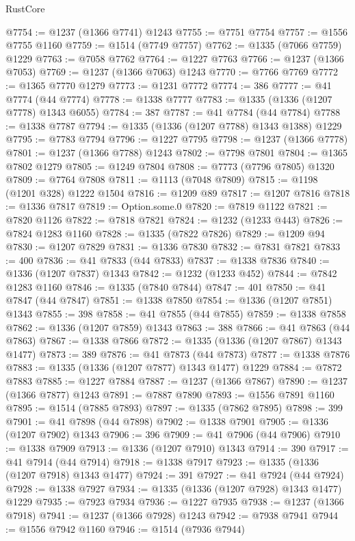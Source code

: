 \begin{lexlean}{RustCore}
\begin{coremodule}
@7754 := @1237 (@1366 @7741) @1243
@7755 := @7751 @7754
@7757 := @1556 @7755 @1160
@7759 := @1514 (@7749 @7757)
@7762 := @1335 (@7066 @7759) @1229
@7763 := @7058 @7762
@7764 := @1227 @7763
@7766 := @1237 (@1366 @7053)
@7769 := @1237 (@1366 @7063) @1243
@7770 := @7766 @7769
@7772 := @1365 @7770 @1279
@7773 := @1231 @7772
@7774 := 386
@7777 := @41 @7774 (@44 @7774)
@7778 := @1338 @7777
@7783 := @1335 (@1336 (@1207 @7778) @1343 @6055)
@7784 := 387
@7787 := @41 @7784 (@44 @7784)
@7788 := @1338 @7787
@7794 := @1335 (@1336 (@1207 @7788) @1343 @1388) @1229
@7795 := @7783 @7794
@7796 := @1227 @7795
@7798 := @1237 (@1366 @7778)
@7801 := @1237 (@1366 @7788) @1243
@7802 := @7798 @7801
@7804 := @1365 @7802 @1279
@7805 := @1249 @7804
@7808 := @7773 (@7796 @7805) @1320
@7809 := @7764 @7808
@7811 := @1113 (@7048 @7809)
@7815 := @1198 (@1201 @328) @1222 @1504
@7816 := @1209 @89
@7817 := @1207 @7816
@7818 := @1336 @7817
@7819 := Option.some.{0}
@7820 := @7819 @1122
@7821 := @7820 @1126
@7822 := @7818 @7821
@7824 := @1232 (@1233 @443)
@7826 := @7824 @1283 @1160
@7828 := @1335 (@7822 @7826)
@7829 := @1209 @94
@7830 := @1207 @7829
@7831 := @1336 @7830
@7832 := @7831 @7821
@7833 := 400
@7836 := @41 @7833 (@44 @7833)
@7837 := @1338 @7836
@7840 := @1336 (@1207 @7837) @1343
@7842 := @1232 (@1233 @452)
@7844 := @7842 @1283 @1160
@7846 := @1335 (@7840 @7844)
@7847 := 401
@7850 := @41 @7847 (@44 @7847)
@7851 := @1338 @7850
@7854 := @1336 (@1207 @7851) @1343
@7855 := 398
@7858 := @41 @7855 (@44 @7855)
@7859 := @1338 @7858
@7862 := @1336 (@1207 @7859) @1343
@7863 := 388
@7866 := @41 @7863 (@44 @7863)
@7867 := @1338 @7866
@7872 := @1335 (@1336 (@1207 @7867) @1343 @1477)
@7873 := 389
@7876 := @41 @7873 (@44 @7873)
@7877 := @1338 @7876
@7883 := @1335 (@1336 (@1207 @7877) @1343 @1477) @1229
@7884 := @7872 @7883
@7885 := @1227 @7884
@7887 := @1237 (@1366 @7867)
@7890 := @1237 (@1366 @7877) @1243
@7891 := @7887 @7890
@7893 := @1556 @7891 @1160
@7895 := @1514 (@7885 @7893)
@7897 := @1335 (@7862 @7895)
@7898 := 399
@7901 := @41 @7898 (@44 @7898)
@7902 := @1338 @7901
@7905 := @1336 (@1207 @7902) @1343
@7906 := 396
@7909 := @41 @7906 (@44 @7906)
@7910 := @1338 @7909
@7913 := @1336 (@1207 @7910) @1343
@7914 := 390
@7917 := @41 @7914 (@44 @7914)
@7918 := @1338 @7917
@7923 := @1335 (@1336 (@1207 @7918) @1343 @1477)
@7924 := 391
@7927 := @41 @7924 (@44 @7924)
@7928 := @1338 @7927
@7934 := @1335 (@1336 (@1207 @7928) @1343 @1477) @1229
@7935 := @7923 @7934
@7936 := @1227 @7935
@7938 := @1237 (@1366 @7918)
@7941 := @1237 (@1366 @7928) @1243
@7942 := @7938 @7941
@7944 := @1556 @7942 @1160
@7946 := @1514 (@7936 @7944)

\end{coremodule}
\end{lexlean}
